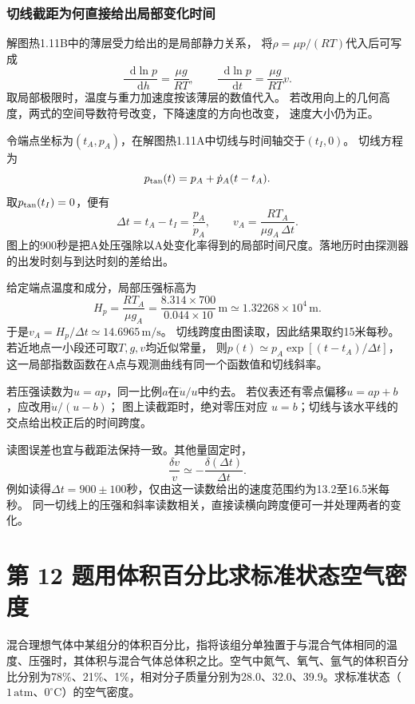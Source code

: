 \documentclass[UTF8,fontset=fandol,a4paper,11pt]{ctexart}
\newcommand{\dd}{\mathop{}\!\mathrm{d}}
\begin{document}
\subsubsection*{切线截距为何直接给出局部变化时间}
解图热1.11B中的薄层受力给出的是局部静力关系，
将$\rho=\mu p/(RT)$代入后可写成
\[
\frac{\dd\ln p}{\dd h}=\frac{\mu g}{RT},\qquad
\frac{\dd\ln p}{\dd t}=\frac{\mu g}{RT}v.
\]
取局部极限时，温度与重力加速度按该薄层的数值代入。
若改用向上的几何高度，两式的空间导数符号改变，下降速度的方向也改变，
速度大小仍为正。

令端点坐标为$(t_A,p_A)$，在解图热1.11A中切线与时间轴交于$(t_I,0)$。
切线方程为
\[
p_{\rm tan}(t)=p_A+\dot p_A(t-t_A).
\]
取$p_{\rm tan}(t_I)=0$，便有
\[
\Delta t=t_A-t_I=\frac{p_A}{\dot p_A},\qquad
v_A=\frac{RT_A}{\mu g_A\,\Delta t}.
\]
图上的900秒是把A处压强除以A处变化率得到的局部时间尺度。落地历时由探测器的出发时刻与到达时刻的差给出。

给定端点温度和成分，局部压强标高为
\[
H_p=\frac{RT_A}{\mu g_A}
=\frac{8.314\times700}{0.044\times10}
\,\mathrm m\simeq1.32268\times10^4\,\mathrm m.
\]
于是$v_A=H_p/\Delta t\simeq14.6965\,\mathrm{m/s}$。
切线跨度由图读取，因此结果取约15米每秒。
若近地点一小段还可取$T,g,v$均近似常量，
则$p(t)\simeq p_A\exp[(t-t_A)/\Delta t]$，
这一局部指数函数在A点与观测曲线有同一个函数值和切线斜率。

若压强读数为$u=ap$，同一比例$a$在$\dot u/u$中约去。
若仪表还有零点偏移$u=ap+b$，应改用$\dot u/(u-b)$；
图上读截距时，绝对零压对应 $u=b$；切线与该水平线的交点给出校正后的时间跨度。

读图误差也宜与截距法保持一致。其他量固定时，
\[
\frac{\delta v}{v}\simeq-\frac{\delta(\Delta t)}{\Delta t}.
\]
例如读得$\Delta t=900\pm100$秒，仅由这一读数给出的速度范围约为13.2至16.5米每秒。
同一切线上的压强和斜率读数相关，直接读横向跨度便可一并处理两者的变化。




\section*{第 12 题\quad 用体积百分比求标准状态空气密度}

混合理想气体中某组分的体积百分比，指将该组分单独置于与混合气体相同的温度、压强时，其体积与混合气体总体积之比。空气中氮气、氧气、氩气的体积百分比分别为78\%、21\%、1\%，相对分子质量分别为28.0、32.0、39.9。求标准状态（$1\,\mathrm{atm}$、$0^\circ\mathrm C$）的空气密度。
\end{document}
